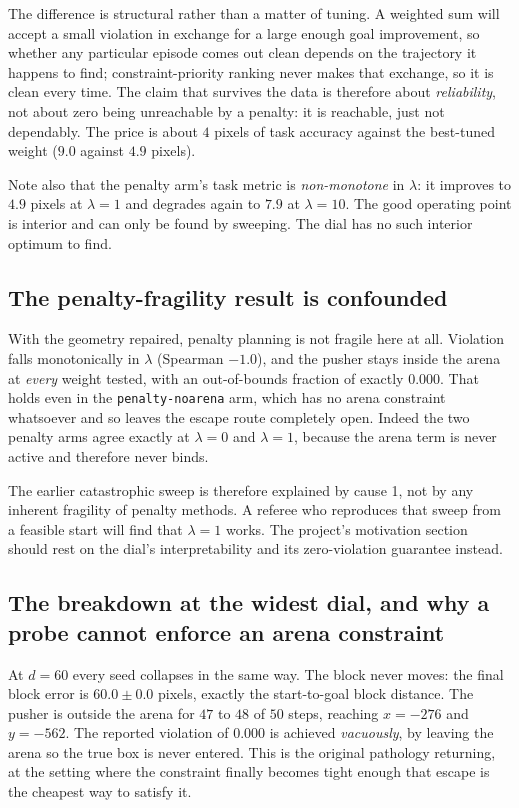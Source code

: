 \documentclass[11pt,a4paper]{article}
\newcommand{\dial}{\ensuremath{d}}
\begin{document}
The difference is structural rather than a matter of tuning. A weighted sum will accept a
small violation in exchange for a large enough goal improvement, so whether any particular
episode comes out clean depends on the trajectory it happens to find; constraint-priority
ranking never makes that exchange, so it is clean every time. The claim that survives the data
is therefore about \emph{reliability}, not about zero being unreachable by a penalty: it is
reachable, just not dependably. The price is about $4$ pixels of task accuracy against the
best-tuned weight ($9.0$ against $4.9$ pixels).

Note also that the penalty arm's task metric is \emph{non-monotone} in $\lambda$: it improves
to $4.9$ pixels at $\lambda = 1$ and degrades again to $7.9$ at $\lambda = 10$. The good
operating point is interior and can only be found by sweeping. The dial has no such interior
optimum to find.

\subsection{The penalty-fragility result is confounded}

With the geometry repaired, penalty planning is not fragile here at all. Violation falls
monotonically in $\lambda$ (Spearman $-1.0$), and the pusher stays inside the arena at
\emph{every} weight tested, with an out-of-bounds fraction of exactly $0.000$. That holds even
in the \texttt{penalty-noarena} arm, which has no arena constraint whatsoever and so leaves
the escape route completely open. Indeed the two penalty arms agree exactly at $\lambda = 0$
and $\lambda = 1$, because the arena term is never active and therefore never binds.

The earlier catastrophic sweep is therefore explained by cause 1, not by any inherent
fragility of penalty methods. A referee who reproduces that sweep from a feasible start will
find that $\lambda = 1$ works. The project's motivation section should rest on the dial's
interpretability and its zero-violation guarantee instead.

\subsection{The breakdown at the widest dial, and why a probe cannot enforce an arena constraint}
\label{sec:breakdown}

At $\dial = 60$ every seed collapses in the same way. The block never moves: the final block
error is $60.0 \pm 0.0$ pixels, exactly the start-to-goal block distance. The pusher is
outside the arena for $47$ to $48$ of $50$ steps, reaching $x = -276$ and $y = -562$. The
reported violation of $0.000$ is achieved \emph{vacuously}, by leaving the arena so the true
box is never entered. This is the original pathology returning, at the setting where the
constraint finally becomes tight enough that escape is the cheapest way to satisfy it.
\end{document}
